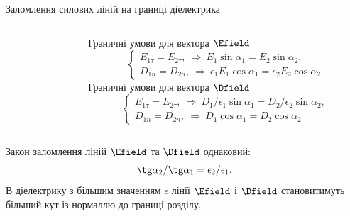 \documentclass[]{beamer}
\begin{document}
\begin{frame}{Заломлення силових ліній на границі діелектрика}{}
\begin{columns}
\begin{column}{0.55\linewidth}
		\end{column}
		\begin{column}{0.45\linewidth}\scriptsize
			Граничні умови для вектора $\Efield$
			\begin{equation*}
				\begin{cases}
					E_{1\tau} = E_{2\tau},\ \Rightarrow\ E_1\sin\alpha_1 = E_2\sin\alpha_2, \\
					D_{1n} = D_{2n},\ \Rightarrow\ \epsilon_1E_1\cos\alpha_1 =
					\epsilon_2E_2\cos\alpha_2
				\end{cases}
			\end{equation*}
			Граничні умови для вектора $\Dfield$
			\begin{equation*}
				\begin{cases}
					E_{1\tau} = E_{2\tau},\ \Rightarrow\ D_1/\epsilon_1\sin\alpha_1 =
					D_2/\epsilon_2\sin\alpha_2, \\
					D_{1n} = D_{2n},\ \Rightarrow\ D_1\cos\alpha_1 =
					D_2\cos\alpha_2
				\end{cases}
			\end{equation*}
		\end{column}
	\end{columns}
	\begin{block}{}\justifying
		Закон заломлення ліній $\Efield$ та $\Dfield$ однаковий:
		\begin{equation*}
			\tg\alpha_2 / \tg\alpha_1 = \epsilon_2 / \epsilon_1.
		\end{equation*}
		В діелектрику з більшим значенням $\epsilon$ лінії $\Efield$ і $\Dfield$
		становитимуть більший кут із нормаллю до границі розділу.
	\end{block}
\end{frame}


%
\end{document}
